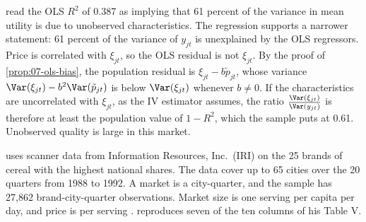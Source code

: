 \citet[p.~874]{BerryLevinsohnPakes1995} read the OLS $R^2$ of 0.387 as implying that 61 percent of the variance in
mean utility is due to unobserved characteristics. The regression supports a narrower statement: 61 percent of the
variance of $y_{jt}$ is unexplained by the OLS regressors. Price is correlated with $\xi_{jt}$, so the OLS residual
is not $\xi_{jt}$. By the proof of \cref{prop:07-ols-bias}, the population residual is $\xi_{jt} - b\tilde p_{jt}$,
whose variance $\Var(\xi_{jt}) - b^2\Var(\tilde p_{jt})$ is below $\Var(\xi_{jt})$ whenever $b \neq 0$. If the
characteristics are uncorrelated with $\xi_{jt}$, as the IV estimator assumes, the ratio
$\frac{\Var(\xi_{jt})}{\Var(y_{jt})}$ is therefore at least the population value of $1 - R^2$, which the sample puts at
0.61. Unobserved quality is large in this market.

\citet{Nevo2001} uses scanner data from Information Resources, Inc.\ (IRI) on the 25 brands of cereal with the
highest national shares. The data cover up to 65 cities over the 20 quarters from 1988 to 1992. A market is a city-quarter, and the sample has 27,862 brand-city-quarter
observations. Market size is one serving per capita per day, and price is per serving \citep[pp.~317,
337]{Nevo2001}.  reproduces seven of the ten columns of his Table V.

